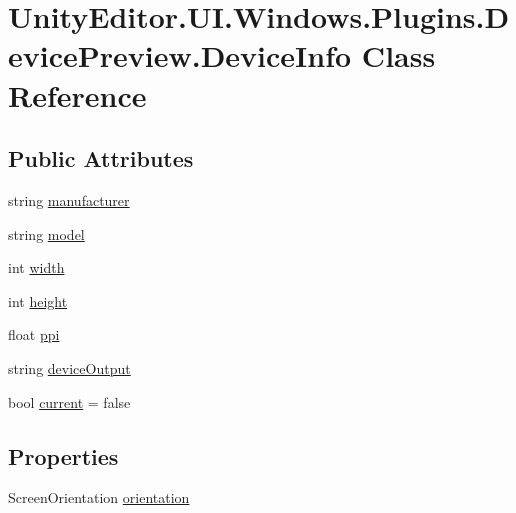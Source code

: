 \hypertarget{class_unity_editor_1_1_u_i_1_1_windows_1_1_plugins_1_1_device_preview_1_1_device_info}{}\section{Unity\+Editor.\+U\+I.\+Windows.\+Plugins.\+Device\+Preview.\+Device\+Info Class Reference}
\label{class_unity_editor_1_1_u_i_1_1_windows_1_1_plugins_1_1_device_preview_1_1_device_info}
\subsection*{Public Attributes}
\begin{DoxyCompactItemize}
\item 
string \hyperlink{class_unity_editor_1_1_u_i_1_1_windows_1_1_plugins_1_1_device_preview_1_1_device_info_af038b11c202d2e851e46216a622cce95}{manufacturer}
\item 
string \hyperlink{class_unity_editor_1_1_u_i_1_1_windows_1_1_plugins_1_1_device_preview_1_1_device_info_a9514b0ca0fdae6ed0259899aa6577d5e}{model}
\item 
int \hyperlink{class_unity_editor_1_1_u_i_1_1_windows_1_1_plugins_1_1_device_preview_1_1_device_info_a527516d0f91180a86020b16c3777313c}{width}
\item 
int \hyperlink{class_unity_editor_1_1_u_i_1_1_windows_1_1_plugins_1_1_device_preview_1_1_device_info_a327c66057c93214f2ec713cfefc92054}{height}
\item 
float \hyperlink{class_unity_editor_1_1_u_i_1_1_windows_1_1_plugins_1_1_device_preview_1_1_device_info_a90b553795912b22a4cd43415202b2aff}{ppi}
\item 
string \hyperlink{class_unity_editor_1_1_u_i_1_1_windows_1_1_plugins_1_1_device_preview_1_1_device_info_a77fa32bc34852590a70d0d406acc5f28}{device\+Output}
\item 
bool \hyperlink{class_unity_editor_1_1_u_i_1_1_windows_1_1_plugins_1_1_device_preview_1_1_device_info_a3e748489732f32d7cb088b6e1e193ee5}{current} = false
\end{DoxyCompactItemize}
\subsection*{Properties}
\begin{DoxyCompactItemize}
\item 
Screen\+Orientation \hyperlink{class_unity_editor_1_1_u_i_1_1_windows_1_1_plugins_1_1_device_preview_1_1_device_info_a9654c31257056bb50c4b5fafd0d513f4}{orientation}
\end{DoxyCompactItemize}


